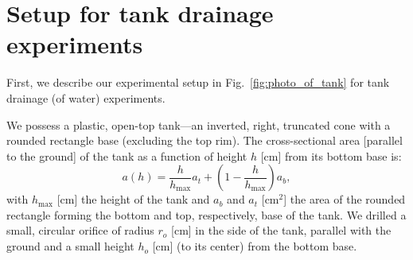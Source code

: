 \documentclass[openacc]{rsproca_new}%
\begin{document}
%




\section{Setup for tank drainage experiments} \label{sec:expt}
First, we describe our experimental setup in Fig.~\ref{fig:photo_of_tank} for tank drainage (of water) experiments.

We possess a plastic, open-top tank---an inverted, right, truncated cone with a rounded rectangle base (excluding the top rim). 
The cross-sectional area [parallel to the ground] of the tank as a function of height $h$ [cm] from its bottom base is:
\begin{equation}
	a(h) = \frac{h}{h_{\text{max}}}a_t + \left(1-\frac{h}{h_{\text{max}}}\right) a_b, \label{eq:a_of_h}
\end{equation}
with $h_{\text{max}}$ [cm] the height of the tank and $a_b$ and $a_t$ [cm$^2$] the area of the rounded rectangle forming the bottom and top, respectively, base of the tank.
We drilled a small, circular orifice of radius $r_o$ [cm] in the side of the tank, parallel with the ground and a small height $h_o$ [cm] (to its center) from the bottom base.
\end{document}
